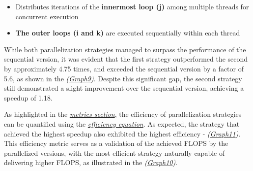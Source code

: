 \begin{itemize}
    \item Distributes iterations of the \textbf{innermost loop (j)} among multiple threads for concurrent execution
    \item \textbf{The outer loops (i and k)} are executed sequentially within each thread
\end{itemize}

\hspace*{1cm}

While both parallelization strategies managed to surpass the performance of the
sequential version, it was evident that the first strategy outperformed the second
by approximately 4.75 times, and exceeded the sequential version by a factor of 5.6,
as shown in the \textit{(\hyperref[graph:BLG5]{Graph9})}. Despite this significant gap, the second strategy still 
demonstrated a slight improvement over the sequential version, achieving a speedup 
of 1.18.

As highlighted in the \textit{\hyperref[sec:metrics]{metrics section}}, the efficiency of parallelization strategies 
can be quantified using the \textit{\hyperref[eq:efficiency]{efficiency equation}}. 
As expected, the strategy that achieved the highest speedup also exhibited the highest 
efficiency - \textit{(\hyperref[graph:BLG11]{Graph11})}. This efficiency metric serves as a 
validation of the achieved FLOPS by the parallelized versions, with the most 
efficient strategy naturally capable of delivering higher FLOPS, as illustrated 
in the \textit{(\hyperref[graph:BLG10]{Graph10})}.